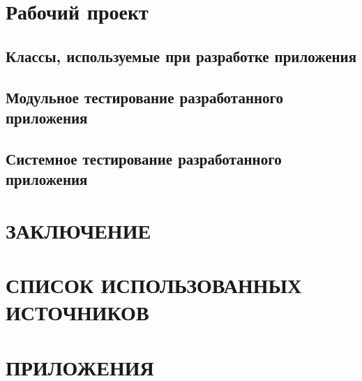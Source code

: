 \documentclass[a4paper,12pt]{report}
\begin{document}
	\chapter{Рабочий проект}
	\section{Классы, используемые при разработке приложения}
	\section{Модульное тестирование разработанного приложения}
	\section{Системное тестирование разработанного приложения}
	
	\chapter*{ЗАКЛЮЧЕНИЕ}
	
	\chapter*{СПИСОК ИСПОЛЬЗОВАННЫХ ИСТОЧНИКОВ}
	
	\chapter*{ПРИЛОЖЕНИЯ}
	
\end{document}
